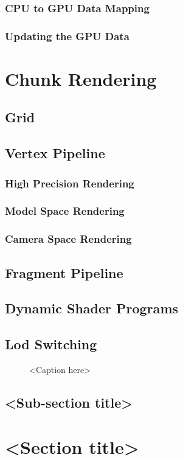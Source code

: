 \subsubsection{CPU to GPU Data Mapping}

\subsubsection{Updating the GPU Data}


\section{Chunk Rendering}

\subsection{Grid}

\subsection{Vertex Pipeline}

\subsubsection{High Precision Rendering}

\subsubsection{Model Space Rendering}

\subsubsection{Camera Space Rendering}

\subsection{Fragment Pipeline}

\subsection{Dynamic Shader Programs}

\subsection{Lod Switching}



\begin{figure}[htb]
\centering
\caption{<Caption here>}
\end{figure}

\subsection{<Sub-section title>}

\section{<Section title>}

